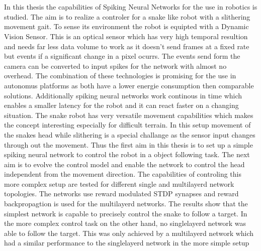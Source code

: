 \chapter{\abstractname}


In this thesis the capabilities of Spiking Neural Networks for the use in robotics is studied. The aim is to realize a controler for a snake like robot with a slithering movement gait. To sense its environment the robot is equipted with a Dynamic Vision Sensor. This is an optical sensor which has very high temporal resultion and needs far less data volume to work as it doesn't send frames at a fixed rate but events if a significant change in a pixel ocurrs. The events send form the camera can be converted to input spikes for the network with almost no overhead. The combination of these technologies is promising for the use in autonomus platforms as both have a lower energie consumption then comparable solutions. Additionally spiking neural networks work continous in time which enables a smaller latency for the robot and it can react faster on a changing situation. The snake robot has very versatile movement capabilities which makes the concept interesting especially for difficult terrain.
\newline
In this setup movement of the snakes head while slithering is a special challange as the sensor input changes through out the movement. Thus the first aim in this thesis is to set up a simple spiking neural network to control the robot in a object following task. The next aim is to evolve the control model and enable the network to control the head independent from the movement direction. The capabilities of controling this more complex setup are tested for different single and multilayerd network topologies. The networks use reward modulated STDP synapses and reward backpropagtion is used for the multilayerd networks.
The results show that the simplest network is capable to precisely control the snake to follow a target. In the more complex control task on the other hand, no singlelayerd network was able to follow the target. This was only achieved by a multilayerd network which had a similar performance to the singlelayerd network in the more simple setup





